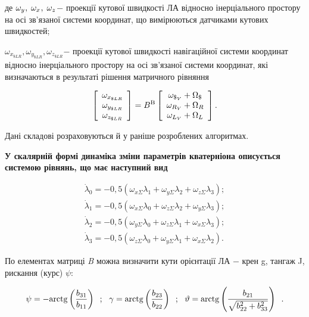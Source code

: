де  $\omega_{y_{{\rm }} } ,{\rm \; }\omega_{x_{{\rm }} } ,{\rm \; }\omega_{z_{{
\rm }} } $$-$ проекції кутової швидкості ЛА відносно інерціального простору на осі 
зв'язаної системи координат, що вимірюються датчиками кутових швидкостей;

$\omega_{x_{\$ LR} } ,\omega_{y_{\$ LR} } ,\omega_{z_{\$ LR} } $$-$ проекції кутової 
швидкості навігаційної системи координат відносно інерціального простору на осі зв'язаної 
системи координат, які визначаються в результаті рішення матричного рівняння 

\[\left[\begin{array}{c} {\omega_{x_{\$ LR} } } \\ {\omega_{y_{\$ LR} } } \\ {
\omega_{z_{\$ LR} } } \end{array}\right]=B^{{\rm B}} \left[\begin{array}{c} {\omega 
_{\$_{V} } +\Omega_{\$ } } \\ {\omega_{R_{V} } +\Omega_{R} } \\ {\omega_{L_{V} 
} +\Omega_{L} } \end{array}\right].\] 

Дані складові розраховуються й у раніше розроблених алгоритмах.


\textbf{У скалярній формі динаміка зміни параметрів кватерніона описується  системою 
рівнянь, що має наступний вид}

\[\begin{array}{l} {\dot{\lambda }_{0} =-0,5(\omega_{x\Sigma } \lambda_{1} +\omega 
_{y\Sigma } \lambda_{2} +\omega_{z\Sigma } \lambda_{3} );} \\ {\dot{\lambda }_{1} 
=-0,5(\omega_{x\Sigma } \lambda_{0} +\omega_{z\Sigma } \lambda_{2} +\omega_{y
\Sigma } \lambda_{3} );} \\ {\dot{\lambda }_{2} =-0,5(\omega_{y\Sigma } \lambda 
_{0} +\omega_{z\Sigma } \lambda_{1} +\omega_{x\Sigma } \lambda_{3} );} \\ {\dot{
\lambda }_{3} =-0,5(\omega_{z\Sigma } \lambda_{0} +\omega_{y\Sigma } \lambda_{1} 
+\omega_{x\Sigma } \lambda_{2} ).} \end{array}\] 

По елементах матриці  \textit{B} можна визначити кути орієнтації ЛА $-$  крен g, 
тангаж  J, рискання (курс) $\psi $: 

\[\psi =-{\rm arctg}\left(\frac{b_{31} }{b_{11} } \right){\rm \; \; };\, \, \, \, 
\gamma ={\rm arctg}\left(\frac{b_{23} }{b_{22} } \right){\rm \; \; };\, \, \, \, 
\vartheta ={\rm arctg}\left(\frac{b_{21} }{\sqrt{b_{22}^{2} +b_{33}^{2} } } \right){
\rm \; \; }.\] 

